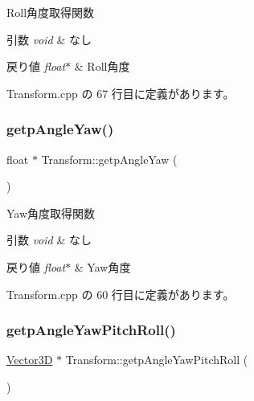 Roll角度取得関数 


\begin{DoxyParams}{引数}
{\em void} & なし \\
\hline
\end{DoxyParams}

\begin{DoxyRetVals}{戻り値}
{\em float$\ast$} & Roll角度 \\
\hline
\end{DoxyRetVals}


 Transform.\+cpp の 67 行目に定義があります。

\mbox{\label{class_transform_a69600cd68c0a99518efec7da592e4841}} 
\subsubsection{\texorpdfstring{getp\+Angle\+Yaw()}{getpAngleYaw()}}
{\footnotesize\ttfamily float $\ast$ Transform\+::getp\+Angle\+Yaw (\begin{DoxyParamCaption}{ }\end{DoxyParamCaption})}



Yaw角度取得関数 


\begin{DoxyParams}{引数}
{\em void} & なし \\
\hline
\end{DoxyParams}

\begin{DoxyRetVals}{戻り値}
{\em float$\ast$} & Yaw角度 \\
\hline
\end{DoxyRetVals}


 Transform.\+cpp の 60 行目に定義があります。

\mbox{\label{class_transform_aadf052a769af0793916a25c88d00640c}} 
\subsubsection{\texorpdfstring{getp\+Angle\+Yaw\+Pitch\+Roll()}{getpAngleYawPitchRoll()}}
{\footnotesize\ttfamily \mbox{\hyperlink{class_vector3_d}{Vector3D}} $\ast$ Transform\+::getp\+Angle\+Yaw\+Pitch\+Roll (\begin{DoxyParamCaption}{ }\end{DoxyParamCaption})}



